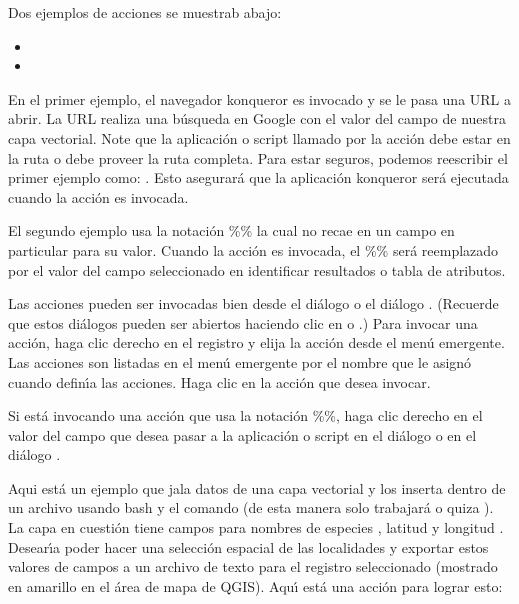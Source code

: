 Dos ejemplos de acciones se muestrab abajo:

\begin{itemize}
  \item {}
  \item {}
\end{itemize}

En el primer ejemplo, el navegador konqueror es invocado y  se le pasa una URL a 
abrir. La URL realiza una b\'usqueda en Google con el valor del campo 
de nuestra capa vectorial. Note que la aplicaci\'on o script llamado por la acci\'on
debe estar en la ruta o debe proveer la  ruta completa. Para estar seguros, podemos
reescribir el primer ejemplo como: . Esto asegurar\'a que la aplicaci\'on konqueror
ser\'a ejecutada cuando la acci\'on es invocada.

El segundo ejemplo usa la notaci\'on \%\% la cual no recae en un campo en particular
para su valor. Cuando la acci\'on es invocada, el \%\% ser\'a reemplazado por
el valor del campo seleccionado en identificar resultados o tabla de atributos.

\label{label_usingactions}
Las acciones pueden ser invocadas bien desde el di\'alogo  o el 
 di\'alogo . 
(Recuerde que estos di\'alogos pueden ser abiertos haciendo clic en
o
.)
Para invocar una acci\'on, 
haga clic derecho en el registro
y elija la acci\'on desde el men\'u emergente. Las acciones son listadas en el men\'u
emergente por el nombre que le asign\'o cuando defin\'{\i}a las acciones. Haga clic en la acci\'on
que desea invocar.

Si est\'a invocando una acci\'on que usa la notaci\'on \%\%, haga clic derecho en el
valor del campo que desea pasar a la aplicaci\'on o script en el di\'alogo  o en el
di\'alogo .

Aqui est\'a un ejemplo que jala datos de una capa vectorial y los inserta
dentro de un archivo usando bash y el comando  (de esta manera solo trabajar\'a
\nix o quiza \osx). La capa en cuesti\'on tiene campos para nombres de especies
, latitud  y longitud
. Desear\'{\i}a poder hacer
una selecci\'on espacial de las localidades y exportar estos valores de campos a
un archivo de texto para el registro seleccionado (mostrado en amarillo en el \'area de mapa de QGIS). Aqu\'{\i} est\'a
una acci\'on para lograr esto:

